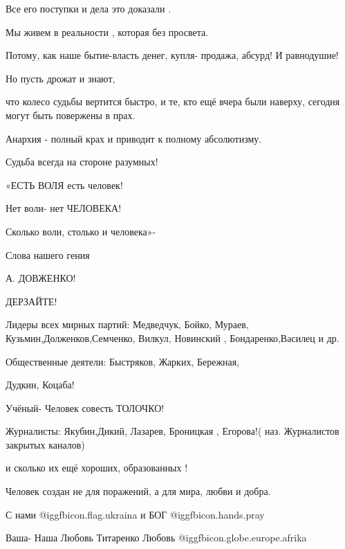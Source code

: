 Все его поступки и дела это доказали .

 Мы живем в реальности , которая без просвета.

Потому, как наше бытие-власть денег, купля- продажа, абсурд! И равнодушие! 

Но пусть дрожат и знают,

что колесо судьбы вертится быстро, и те, кто ещё вчера были наверху, сегодня
могут быть повержены в прах.

Анархия - полный крах и приводит к полному абсолютизму. 

Судьба всегда на стороне разумных!  

«ЕСТЬ ВОЛЯ есть человек!

Нет воли- нет ЧЕЛОВЕКА!

Сколько воли, столько и человека»- 

 Слова нашего гения

 А. ДОВЖЕНКО!

ДЕРЗАЙТЕ! 

Лидеры всех мирных партий: Медведчук, Бойко, Мураев,
Кузьмин,Долженков,Семченко, Вилкул, Новинский  ,  Бондаренко,Василец и др.

 Общественные деятели: Быстряков, Жарких, Бережная, 

 Дудкин, Коцаба!

Учёный- Человек совесть ТОЛОЧКО! 

Журналисты: Якубин,Дикий, Лазарев, Броницкая , Егорова!( наз. Журналистов
закрытых каналов)

и сколько их ещё хороших, образованных !

Человек создан не для поражений, а для мира, любви и добра. 

С нами @igg{fbicon.flag.ukraina} и БОГ @igg{fbicon.hands.pray}  

Ваша- Наша Любовь Титаренко Любовь  @igg{fbicon.globe.europe.afrika} 
